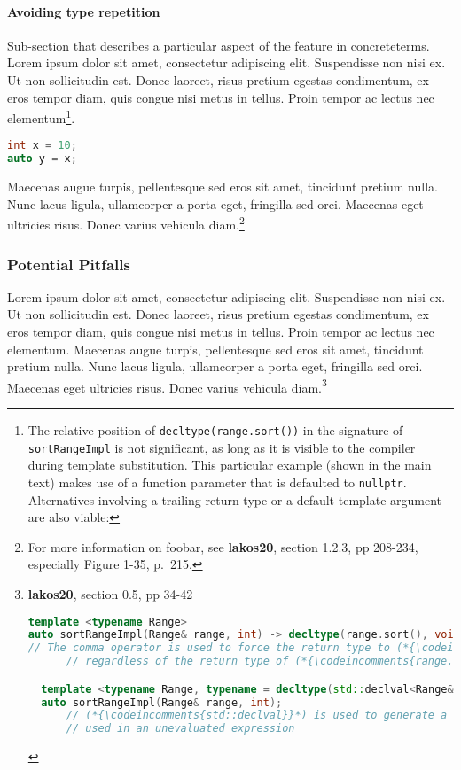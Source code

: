\documentclass[twoside,10pt,letterpaper,usenames]{newstyle-PearsonGeneric-7-38}
\newcommand{\codeincomments}{\color{skyblue}\ttfamily}
\begin{document}
\paragraph[Avoiding type repetition]{Avoiding type repetition}\label{avoiding-type-repetition}

Sub-section that describes a particular aspect of the feature in
concreteterms. Lorem ipsum dolor sit amet, consectetur adipiscing elit.
Suspendisse non nisi ex. Ut non sollicitudin est. Donec laoreet, risus
pretium egestas condimentum, ex eros tempor diam, quis congue nisi metus
in tellus. Proin tempor ac lectus nec elementum{\cprotect\footnote{The
relative position of \texttt{decltype(range.sort())} in the signature
of \texttt{sortRangeImpl} is not significant, as long as it is visible
to the compiler during template substitution. This particular example
(shown in the main text) makes use of a function parameter that is
defaulted to \texttt{nullptr}. Alternatives involving a trailing
return type or a default template argument are also viable:}}.

\begin{lstlisting}[language=C++]
int x = 10;
auto y = x;
\end{lstlisting}
    

Maecenas augue turpis, pellentesque sed eros sit amet, tincidunt pretium
nulla. Nunc lacus ligula, ullamcorper a porta eget, fringilla sed orci.
Maecenas eget ultricies risus. Donec varius vehicula
diam.{\cprotect\footnote{For more information on foobar, see
\textbf{lakos20}, section 1.2.3, pp 208-234, especially Figure 1-35,
p.~215.}}

\subsubsection[Potential Pitfalls]{Potential Pitfalls}\label{potential-pitfalls}

Lorem ipsum dolor sit amet, consectetur adipiscing elit. Suspendisse non
nisi ex. Ut non sollicitudin est. Donec laoreet, risus pretium egestas
condimentum, ex eros tempor diam, quis congue nisi metus in tellus.
Proin tempor ac lectus nec elementum. Maecenas augue turpis,
pellentesque sed eros sit amet, tincidunt pretium nulla. Nunc lacus
ligula, ullamcorper a porta eget, fringilla sed orci. Maecenas eget
ultricies risus. Donec varius vehicula diam.{\cprotect\footnote{\textbf{lakos20},
section 0.5, pp 34-42

\begin{lstlisting}[language=C++, basicstyle={\ttfamily\footnotesize}]
template <typename Range>
auto sortRangeImpl(Range& range, int) -> decltype(range.sort(), void());
// The comma operator is used to force the return type to (*{\codeincomments{void}}*),
      // regardless of the return type of (*{\codeincomments{range.sort()}}*).

  template <typename Range, typename = decltype(std::declval<Range&>().sort()>
  auto sortRangeImpl(Range& range, int);
      // (*{\codeincomments{std::declval}}*) is used to generate a reference to (*{\codeincomments{Range}}*) that can be
      // used in an unevaluated expression
  \end{lstlisting}
      }}
\end{document}
